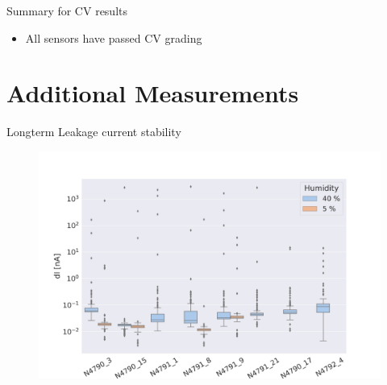 \documentclass{beamer}
\begin{document}
\begin{frame}{Summary for CV results}
  \begin{table}[htbp] %
      \centering
      \footnotesize%
      \setlength\tabcolsep{2pt}%
      \caption{Summary for all protoA sensors}
      \end{table}   


  \begin{itemize}
      \item \alert{All} sensors have \alert{passed} CV grading      
      
  \end{itemize}
\end{frame}

\section{Additional Measurements}


\begin{frame}{Longterm Leakage current stability}
  \begin{figure}
    \includegraphics[width=.9\textwidth]{plots/RangesForCurrentVariationsDryAir.png}
  \end{figure}
  \href{https://indico.cern.ch/event/1121372/contributions/4708329/attachments/2382634/4071804/Longterm_Leakage_Current_Measurements.pdf}{}
\end{frame}
\end{document}
